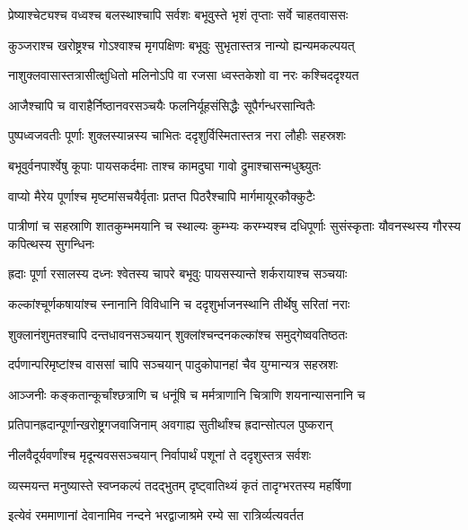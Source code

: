 \twolineshloka
{प्रेष्याश्चेट्यश्च वध्वश्च बलस्थाश्चापि सर्वशः}
{बभूवुस्ते भृशं तृप्ताः सर्वे चाहतवाससः} %

\twolineshloka
{कुञ्जराश्च खरोष्ट्रश्च गोऽश्वाश्च मृगपक्षिणः}
{बभूवुः सुभृतास्तत्र नान्यो ह्यन्यमकल्पयत्} %

\twolineshloka
{नाशुक्लवासास्तत्रासीत्क्षुधितो मलिनोऽपि वा}
{रजसा ध्वस्तकेशो वा नरः कश्चिददृश्यत} %

\twolineshloka
{आजैश्चापि च वाराहैर्निष्ठानवरसञ्चयैः}
{फलनिर्यूहसंसिद्धैः सूपैर्गन्धरसान्वितैः} %

\twolineshloka
{पुष्पध्वजवतीः पूर्णाः शुक्लस्यान्नस्य चाभितः}
{ददृशुर्विस्मितास्तत्र नरा लौहीः सहस्रशः} %

\twolineshloka
{बभूवुर्वनपार्श्वेषु कूपाः पायसकर्दमाः}
{ताश्च कामदुघा गावो द्रुमाश्चासन्मधुश्च्युतः} %

\twolineshloka
{वाप्यो मैरेय पूर्णाश्च मृष्टमांसचयैर्वृताः}
{प्रतप्त पिठरैश्चापि मार्गमायूरकौक्कुटैः} %

\threelineshloka
{पात्रीणां च सहस्राणि शातकुम्भमयानि च}
{स्थाल्यः कुम्भ्यः करम्भ्यश्च दधिपूर्णाः सुसंस्कृताः}
{यौवनस्थस्य गौरस्य कपित्थस्य सुगन्धिनः} %

\twolineshloka
{ह्रदाः पूर्णा रसालस्य दध्नः श्वेतस्य चापरे}
{बभूवुः पायसस्यान्ते शर्करायाश्च सञ्चयाः} %

\twolineshloka
{कल्कांश्चूर्णकषायांश्च स्नानानि विविधानि च}
{ददृशुर्भाजनस्थानि तीर्थेषु सरितां नराः} %

\twolineshloka
{शुक्लानंशुमतश्चापि दन्तधावनसञ्चयान्}
{शुक्लांश्चन्दनकल्कांश्च समुद्गेष्ववतिष्ठतः} %

\twolineshloka
{दर्पणान्परिमृष्टांश्च वाससां चापि सञ्चयान्}
{पादुकोपानहां चैव युग्मान्यत्र सहस्रशः} %

\twolineshloka
{आञ्जनीः कङ्कतान्कूर्चांश्छत्राणि च धनूंषि च}
{मर्मत्राणानि चित्राणि शयनान्यासनानि च} %

\twolineshloka
{प्रतिपानह्रदान्पूर्णान्खरोष्ट्रगजवाजिनाम्}
{अवगाह्य सुतीर्थांश्च ह्रदान्सोत्पल पुष्करान्} %

\twolineshloka
{नीलवैदूर्यवर्णांश्च मृदून्यवससञ्चयान्}
{निर्वापार्थं पशूनां ते ददृशुस्तत्र सर्वशः} %

\twolineshloka
{व्यस्मयन्त मनुष्यास्ते स्वप्नकल्पं तदद्भुतम्}
{दृष्ट्वातिथ्यं कृतं तादृग्भरतस्य महर्षिणा} %

\twolineshloka
{इत्येवं रममाणानां देवानामिव नन्दने}
{भरद्वाजाश्रमे रम्ये सा रात्रिर्व्यत्यवर्तत} %

